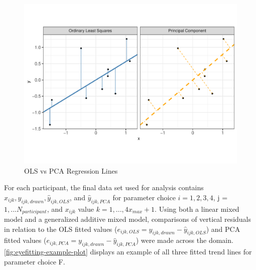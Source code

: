 \documentclass[12pt]{article}
\begin{document}
\begin{figure}[tbp]

{\centering \includegraphics[width=1\linewidth,]{Eye-Fitting-Stright-Lines-in-the-Modern-Era_files/figure-latex/ols-vs-pca-example-1} 

}

\caption{OLS vs PCA Regression Lines}\label{fig:ols-vs-pca-example}
\end{figure}

For each participant, the final data set used for analysis contains
\(x_{ijk}, y_{ijk,drawn}, \hat y_{ijk,OLS}\), and \(\hat y_{ijk,PCA}\)
for parameter choice \(i = 1,2,3,4\), j = \(1,...N_{participant}\), and
\(x_{ijk}\) value \(k = 1, ...,4 x_{max} + 1\). Using both a linear
mixed model and a generalized additive mixed model, comparisons of
vertical residuals in relation to the OLS fitted values
(\(e_{ijk,OLS} = y_{ijk,drawn} - \hat y_{ijk,OLS}\)) and PCA fitted
values (\(e_{ijk,PCA} = y_{ijk,drawn} - \hat y_{ijk,PCA}\)) were made
across the domain. \cref{fig:eyefitting-example-plot} displays an
example of all three fitted trend lines for parameter choice F.
\end{document}
